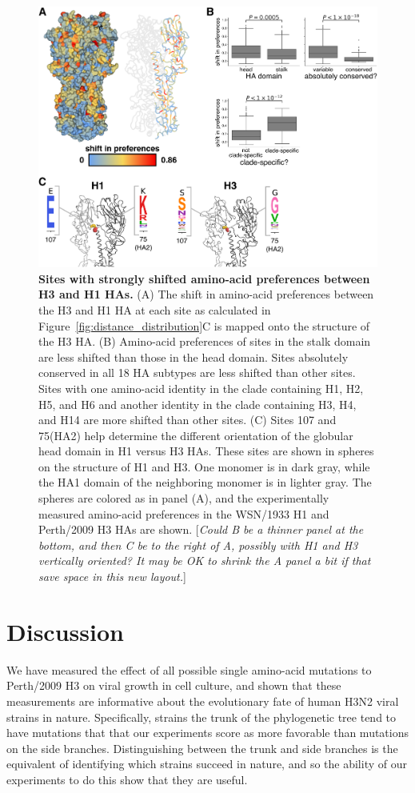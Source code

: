 \documentclass[9pt,twocolumn,twoside]{pnas-new}
\newcommand{\comment}[1]{{\color{red}[\textsl{#1}]}}
\begin{document}
\begin{figure}
\centering
\includegraphics[width=11.4cm]{figs/RMSD_heatmap/RMSD_heatmap.pdf}
\caption{\label{fig:RMSD_heatmap}
{\bf Sites with strongly shifted amino-acid preferences between H3 and H1 HAs.}
(A) The shift in amino-acid preferences between the H3 and H1 HA at each site as calculated in Figure~\ref{fig:distance_distribution}C is mapped onto the structure of the H3 HA. 
(B) Amino-acid preferences of sites in the stalk domain are less shifted than those in the head domain.
Sites absolutely conserved in all 18 HA subtypes are less shifted than other sites.
Sites with one amino-acid identity in the clade containing H1, H2, H5, and H6 and another identity in the clade containing H3, H4, and H14 are more shifted than other sites.
(C) Sites 107 and 75(HA2) help determine the different orientation of the globular head domain in H1 versus H3 HAs.
These sites are shown in spheres on the structure of H1 and H3. 
One monomer is in dark gray, while the HA1 domain of the neighboring monomer is in lighter gray.
The spheres are colored as in panel (A), and the experimentally measured amino-acid preferences in the WSN/1933 H1 and Perth/2009 H3 HAs are shown.
\comment{Could B be a thinner panel at the bottom, and then C be to the right of A, possibly with H1 and H3 vertically oriented? It may be OK to shrink the A panel a bit if that save space in this new layout.}
}
\end{figure}

\section*{Discussion}
\label{sec:discussion}
We have measured the effect of all possible single amino-acid mutations to Perth/2009 H3 on viral growth in cell culture, and shown that these measurements are informative about the evolutionary fate of human H3N2 viral strains in nature.
Specifically, strains the trunk of the phylogenetic tree tend to have mutations that that our experiments score as more favorable than mutations on the side branches.
Distinguishing between the trunk and side branches is the equivalent of identifying which strains succeed in nature, and so the ability of our experiments to do this show that they are useful.
\end{document}
